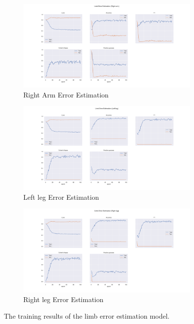 \begin{figure}
  \begin{subfigure}[b]{0.9\linewidth}
      \centering
      \includegraphics[width=\textwidth]{figures/Results/lb/LimbErrorEstimation_Right arm.png}
      \caption{Right Arm Error Estimation}
      \label{fig:riar_lb_ee}
  \end{subfigure}
  \hfill
  \begin{subfigure}[b]{0.9\linewidth}
      \centering
      \includegraphics[width=\textwidth]{figures/Results/lb/LimbErrorEstimation_Left leg.png}
      \caption{Left leg Error Estimation}
      \label{fig:lele_lb_ee}
  \end{subfigure}
  \hfill
  \begin{subfigure}[b]{0.9\linewidth}
      \centering
      \includegraphics[width=\textwidth]{figures/Results/lb/LimbErrorEstimation_Right leg.png}
      \caption{Right leg Error Estimation}
      \label{fig:rileg_lb_ee}
  \end{subfigure}
  \hfill
  \caption[Limb model training results]{The training results of the limb error estimation model.}
     \label{fig:limb_training_results}
\end{figure}

